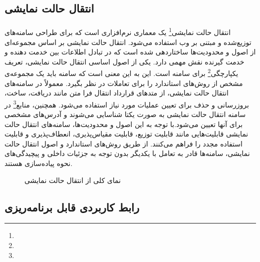 \subsection{انتقال حالت نمایشی}
\label{subsec:rest}
\paragraph{}
{
    انتقال حالت نمایشی\footnote{} یک معماری نرم‌افزاری است که برای طراحی سامنه‌های توزیع‌شده و مبتنی بر وب استفاده می‌شود. انتقال حالت نمایشی بر اساس مجموعه‌ای از اصول و محدودیت‌ها ساختاردهی شده است که در تبادل اطلاعات بین خدمت دهنده‌ و خدمت گیرنده نقش مهمی دارد. یکی از اصول اساسی انتقال حالت نمایشی، تعریف یکپارچگی\footnote{} برای سامنه است. این به این معنی است که سامنه باید یک مجموعه‌ی مشخص از روش‌های استاندارد را برای تعاملات در نظر بگیرد. معمولاً در سامنه‌های انتقال حالت نمایشی، از متدهای قرارداد انتقال فرا متن مانند دریافت، ساخت، بروزرسانی و حذف برای تعیین عملیات مورد نیاز استفاده می‌شود. همچنین، منابع\footnote{} در سامنه انتقال حالت نمایشی به صورت یکتا شناسایی می‌شوند و آدرس‌های مشخصی برای آنها تعیین می‌شود.با توجه به این اصول و محدودیت‌ها، سامنه‌های انتقال حالت نمایشی قابلیت‌هایی مانند قابلیت توزیع، قابلیت مقیاس‌پذیری، انعطاف‌پذیری و قابلیت استفاده مجدد را فراهم می‌کنند. از طریق روش‌های استاندارد و اصول انتقال حالت نمایشی، سامنه‌ها قادر به تعامل با یکدیگر بدون توجه به جزئیات داخلی و پیچیدگی‌های نحوه پیاده‌سازی هستند.   
    \begin{figure}[H]
        \caption{نمای کلی از انتقال حالت نمایشی}
        \label{fig:rest}
    \end{figure}
}

\subsection{رابط کاربردی قابل برنامه‌ریزی}
\label{subsecsec:api}
